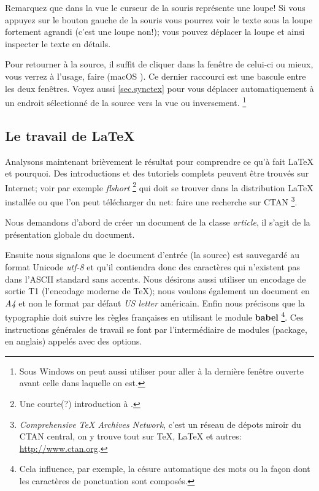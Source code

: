 Remarquez que dans la vue le curseur de la souris représente une loupe! Si vous appuyez sur le bouton gauche de la souris vous pourrez voir le texte sous la loupe fortement agrandi (c'est une loupe non!); vous pouvez déplacer la loupe et ainsi inspecter le texte en détails.

Pour retourner à la source, il suffit de cliquer dans la fenêtre de celui-ci ou mieux, vous verrez à l'usage, faire  (macOS ). Ce dernier raccourci est une bascule entre les deux fenêtres. Voyez aussi \ref{sec.synctex} pour vous déplacer automatiquement à un endroit sélectionné de la source vers la vue ou inversement. \footnote{Sous Windows on peut aussi utiliser  pour aller à la dernière fenêtre ouverte avant celle dans laquelle on est.} 

\subsection{Le travail de \LaTeX}

Analysons maintenant brièvement le résultat pour comprendre ce qu'à fait \LaTeX{} et pourquoi. Des introductions et des tutoriels complets peuvent être trouvés sur Internet; voir par exemple \emph{flshort} \footnote{Une courte(?) introduction à \LaTeXe.} qui doit se trouver dans la distribution \LaTeX{} installée ou que l'on peut télécharger du net: faire une recherche sur CTAN \footnote{\emph{Comprehensive TeX Archives Network}, c'est un réseau de dépots miroir du CTAN central, on y trouve tout sur \TeX{}, \LaTeX{} et autres: \url{http://www.ctan.org}.}.

Nous demandons d'abord de créer un document de la classe \emph{article}, il s'agit de la présentation globale du document. 

Ensuite nous signalons que le document d'entrée (la source) est sauvegardé au format Unicode \emph{utf-8} et qu'il contiendra donc des caractères qui n'existent pas dans l'ASCII standard sans accents. Nous désirons aussi utiliser un encodage de sortie T1 (l'encodage moderne de \TeX); nous voulons également un document en \emph{A4} et non le format par défaut \emph{US letter} américain. Enfin nous précisons que la typographie doit suivre les règles françaises en utilisant le module \textbf{\textsf{babel}} \footnote{ Cela influence, par exemple, la césure automatique des mots ou la façon dont les caractères de ponctuation sont composés.}. Ces instructions générales de travail se font par l'intermédiaire de modules (package, en anglais) appelés avec des options.

